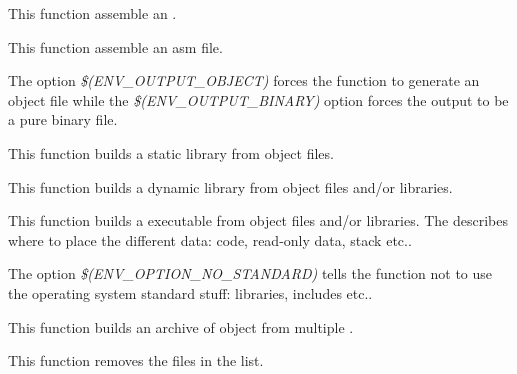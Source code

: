          {
	   This function assemble an .
	 }

         {
	   This function assemble an asm file.

	   \-

	   The option \textit{\$(ENV\_OUTPUT\_OBJECT)} forces the function
	   to generate an object file while the
	   \textit{\$(ENV\_OUTPUT\_BINARY)} option forces the output to be
	   a pure binary file.
	 }

         {
	   This function builds a static library from object files.
	 }

         {
	   This function builds a dynamic library from object files and/or
	   libraries.
	 }

         {
	   This function builds a executable from object files and/or
	   libraries. The  describes where to
	   place the different data: code, read-only data, stack etc..

	   \-

	   The option \textit{\$(ENV\_OPTION\_NO\_STANDARD)} tells the function
	   not to use the operating system standard stuff: libraries, includes
	   etc..
	 }

         {
	   This function builds an archive of object from multiple
	   .
	 }

         {
	   This function removes the files in the list.
	 }

